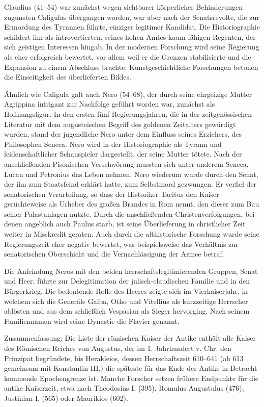 Claudius (41–54) war zunächst wegen sichtbarer körperlicher Behinderungen zugunsten Caligulas übergangen worden, war aber nach der Senatsrevolte, die zur Ermordung des Tyrannen führte, einziger legitimer Kandidat. Die Historiographie schildert ihn als introvertierten, seines hohen Amtes kaum fähigen Regenten, der sich geistigen Interessen hingab. In der modernen Forschung wird seine Regierung als eher erfolgreich bewertet, vor allem weil er die Grenzen stabilisierte und die Expansion zu einem Abschluss brachte. Kunstgeschichtliche Forschungen betonen die Einseitigkeit des überlieferten Bildes.

Ähnlich wie Caligula galt auch Nero (54–68), der durch seine ehrgeizige Mutter Agrippina intrigant zur Nachfolge geführt worden war, zunächst als Hoffnungsfigur. In den ersten fünf Regierungsjahren, die in der zeitgenössischen Literatur mit dem augusteischen Begriff des goldenen Zeitalters gewürdigt wurden, stand der jugendliche Nero unter dem Einfluss seines Erziehers, des Philosophen Seneca. Nero wird in der Historiographie als Tyrann und leidenschaftlicher Schauspieler dargestellt, der seine Mutter tötete. Nach der anschließenden Pisonischen Verschwörung mussten sich unter anderem Seneca, Lucan und Petronius das Leben nehmen. Nero wiederum wurde durch den Senat, der ihn zum Staatsfeind erklärt hatte, zum Selbstmord gezwungen. Er verfiel der senatorischen Verurteilung, so dass der Historiker Tacitus den Kaiser gerüchteweise als Urheber des großen Brandes in Rom nennt, den dieser zum Bau seiner Palastanlagen nutzte. Durch die anschließenden Christenverfolgungen, bei denen angeblich auch Paulus starb, ist seine Überlieferung in christlicher Zeit weiter in Misskredit geraten. Auch durch die althistorische Forschung wurde seine Regierungszeit eher negativ bewertet, was beispielsweise das Verhältnis zur senatorischen Oberschicht und die Vernachlässigung der Armee betraf.

Die Anfeindung Neros mit den beiden herrschaftslegitimierenden Gruppen, Senat und Heer, führte zur Delegitimation der julisch-claudischen Familie und in den Bürgerkrieg. Die bedeutende Rolle des Heeres zeigte sich im Vierkaiserjahr, in welchem sich die Generäle Galba, Otho und Vitellius als kurzzeitige Herrscher ablösten und aus dem schließlich Vespasian als Sieger hervorging. Nach seinem Familiennamen wird seine Dynastie die Flavier genannt.

Zusammenfassung:
Die Liste der römischen Kaiser der Antike enthält alle Kaiser des Römischen Reiches von Augustus, der im 1. Jahrhundert v. Chr. den Prinzipat begründete, bis Herakleios, dessen Herrschaftszeit 610–641 (ab 613 gemeinsam mit Konstantin III.) die späteste für das Ende der Antike in Betracht kommende Epochengrenze ist. Manche Forscher setzen frühere Endpunkte für die antike Kaiserzeit, etwa nach Theodosius I. (395), Romulus Augustulus (476), Justinian I. (565) oder Maurikios (602).

